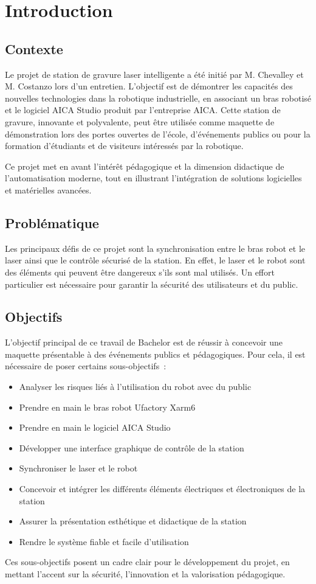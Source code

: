 \chapter{Introduction}

\section{Contexte}

Le projet de station de gravure laser intelligente a été initié par M. Chevalley et M. Costanzo lors d'un entretien. L'objectif est de démontrer les capacités des nouvelles technologies dans la robotique industrielle, en associant un bras robotisé et le logiciel AICA Studio produit par l'entreprise AICA. Cette station de gravure, innovante et polyvalente, peut être utilisée comme maquette de démonstration lors des portes ouvertes de l'école, d'événements publics ou pour la formation d'étudiants et de visiteurs intéressés par la robotique.

Ce projet met en avant l'intérêt pédagogique et la dimension didactique de l'automatisation moderne, tout en illustrant l'intégration de solutions logicielles et matérielles avancées.

\section{Problématique}

Les principaux défis de ce projet sont la synchronisation entre le bras robot et le laser ainsi que le contrôle sécurisé de la station. En effet, le laser et le robot sont des éléments qui peuvent être dangereux s'ils sont mal utilisés. Un effort particulier est nécessaire pour garantir la sécurité des utilisateurs et du public.

\section{Objectifs}

L'objectif principal de ce travail de Bachelor est de réussir à concevoir une maquette présentable à des événements publics et pédagogiques. Pour cela, il est nécessaire de poser certains sous-objectifs :

\begin{itemize}
    \item Analyser les risques liés à l'utilisation du robot avec du public
    \item Prendre en main le bras robot Ufactory Xarm6
    \item Prendre en main le logiciel AICA Studio
    \item Développer une interface graphique de contrôle de la station
    \item Synchroniser le laser et le robot
    \item Concevoir et intégrer les différents éléments électriques et électroniques de la station
    \item Assurer la présentation esthétique et didactique de la station
    \item Rendre le système fiable et facile d'utilisation
\end{itemize}

Ces sous-objectifs posent un cadre clair pour le développement du projet, en mettant l'accent sur la sécurité, l'innovation et la valorisation pédagogique.


